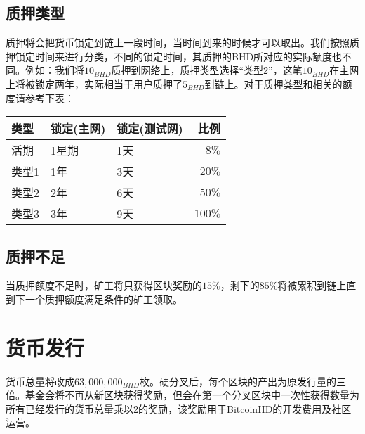 \subsection{质押类型}
\begin{flushleft}
    质押将会把货币锁定到链上一段时间，当时间到来的时候才可以取出。我们按照质押锁定时间来进行分类，不同的锁定时间，其质押的BHD所对应的实际额度也不同。例如：我们将$10_{BHD}$质押到网络上，质押类型选择``类型2''，这笔$10_{BHD}$在主网上将被锁定两年，实际相当于用户质押了$5_{BHD}$到链上。对于质押类型和相关的额度请参考下表：
\end{flushleft}
\begin{tabular}{ |p{3cm}|p{3cm}|p{3cm}|r| }
    \hline
    \rowcolor{lightgray} 类型 & 锁定(主网) & 锁定(测试网) & 比例 \\[5pt]
    \hline
    活期 & 1星期 & 1天 & $8\%$ \\[5pt]
    \rowcolor{lightgray!30} 类型1 & 1年 & 3天 & $20\%$ \\[5pt]
    类型2 & 2年 & 6天 & $50\%$ \\[5pt]
    \rowcolor{lightgray!30} 类型3 & 3年 & 9天 & $100\%$ \\[5pt]
    \hline
\end{tabular}
\subsection{质押不足}
\begin{flushleft}
    当质押额度不足时，矿工将只获得区块奖励的$15\%$，剩下的$85\%$将被累积到链上直到下一个质押额度满足条件的矿工领取。
\end{flushleft}
\section{货币发行}
\begin{flushleft}
    货币总量将改成$63,000,000_{BHD}$枚。硬分叉后，每个区块的产出为原发行量的三倍。基金会将不再从新区块获得奖励，但会在第一个分叉区块中一次性获得数量为所有已经发行的货币总量乘以2的奖励，该奖励用于BitcoinHD的开发费用及社区运营。
\end{flushleft}
